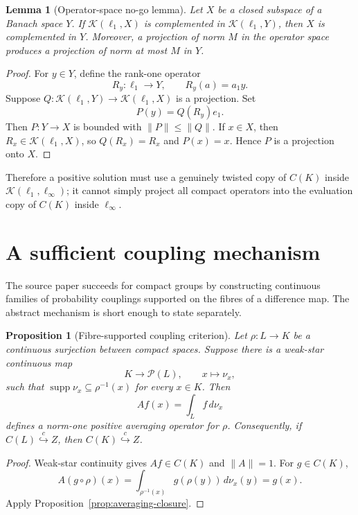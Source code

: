 \documentclass[11pt]{article}
\newtheorem{proposition}[theorem]{Proposition}
\newtheorem{lemma}[theorem]{Lemma}
\theoremstyle{definition}
\theoremstyle{remark}
\newcommand{\C}{C}
\newcommand{\Pp}{\mathcal P}
\newcommand{\supp}{\operatorname{supp}}
\newcommand{\Kop}{\mathcal K}
\newcommand{\hookc}{\stackrel{c}{\hookrightarrow}}
\begin{document}
\begin{lemma}[Operator-space no-go lemma]\label{lem:no-go}
Let $X$ be a closed subspace of a Banach space $Y$.  If
$\Kop(\ell_1,X)$ is complemented in $\Kop(\ell_1,Y)$, then $X$ is
complemented in $Y$.  Moreover, a projection of norm $M$ in the operator
space produces a projection of norm at most $M$ in $Y$.
\end{lemma}

\begin{proof}
For $y\in Y$, define the rank-one operator
\[
       R_y:\ell_1\to Y,\qquad R_y(a)=a_1y.
\]
Suppose $Q:\Kop(\ell_1,Y)\to\Kop(\ell_1,X)$ is a projection.  Set
\[
       P(y)=Q(R_y)e_1.
\]
Then $P:Y\to X$ is bounded with $\|P\|\leq\|Q\|$.  If $x\in X$, then
$R_x\in\Kop(\ell_1,X)$, so $Q(R_x)=R_x$ and $P(x)=x$.  Hence $P$ is a
projection onto $X$.
\end{proof}

Therefore a positive solution must use a genuinely twisted copy of
$\C(K)$ inside $\Kop(\ell_1,\ell_\infty)$; it cannot simply project all
compact operators into the evaluation copy of $\C(K)$ inside
$\ell_\infty$.

\section{A sufficient coupling mechanism}

The source paper succeeds for compact groups by constructing continuous
families of probability couplings supported on the fibres of a difference
map.  The abstract mechanism is short enough to state separately.

\begin{proposition}[Fibre-supported coupling criterion]\label{prop:coupling}
Let $\rho:L\to K$ be a continuous surjection between compact spaces.
Suppose there is a weak-star continuous map
\[
       K\longrightarrow\Pp(L),\qquad x\longmapsto\nu_x,
\]
such that $\supp\nu_x\subseteq\rho^{-1}(x)$ for every $x\in K$.  Then
\[
       Af(x)=\int_L f\,d\nu_x
\]
defines a norm-one positive averaging operator for $\rho$.  Consequently,
if $\C(L)\hookc Z$, then $\C(K)\hookc Z$.
\end{proposition}

\begin{proof}
Weak-star continuity gives $Af\in\C(K)$ and $\|A\|=1$.  For
$g\in\C(K)$,
\[
 A(g\circ\rho)(x)
 =\int_{\rho^{-1}(x)}g(\rho(y))\,d\nu_x(y)=g(x).
\]
Apply Proposition~\ref{prop:averaging-closure}.
\end{proof}
\end{document}
